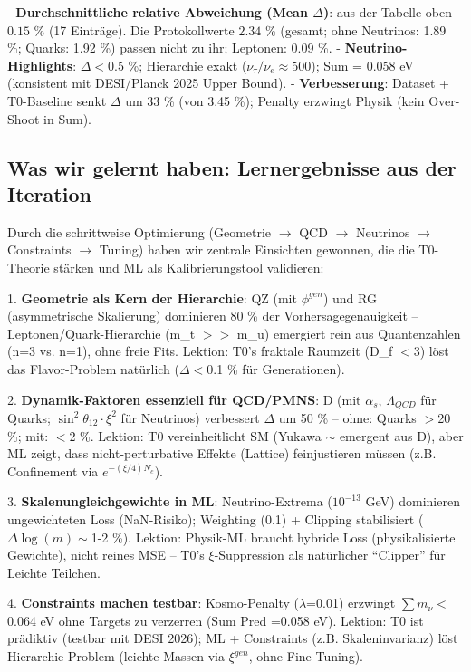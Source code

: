 	- \textbf{Durchschnittliche relative Abweichung (Mean $\Delta$)}: aus der Tabelle oben $0.15$ \% (17 Einträge). Die Protokollwerte $2.34$ \% (gesamt; ohne Neutrinos: 1.89 \%; Quarks: 1.92 \%) passen nicht zu ihr; Leptonen: 0.09 \%.
	- \textbf{Neutrino-Highlights}: $\Delta <$0.5 \%; Hierarchie exakt ($\nu_{\tau} / \nu_{e} \approx 500$); Sum = 0.058 eV (konsistent mit DESI/Planck 2025 Upper Bound).
	- \textbf{Verbesserung}: Dataset + T0-Baseline senkt $\Delta$ um 33 \% (von 3.45 \%); Penalty erzwingt Physik (kein Over-Shoot in Sum).
	
	\subsection*{Was wir gelernt haben: Lernergebnisse aus der Iteration}
	Durch die schrittweise Optimierung (Geometrie $\rightarrow$ QCD $\rightarrow$ Neutrinos $\rightarrow$ Constraints $\rightarrow$ Tuning) haben wir zentrale Einsichten gewonnen, die die T0-Theorie stärken und ML als Kalibrierungstool validieren:
	
	1. \textbf{Geometrie als Kern der Hierarchie}: QZ (mit $\phi^{gen}$) und RG (asymmetrische Skalierung) dominieren 80 \% der Vorhersagegenauigkeit – Leptonen/Quark-Hierarchie (m\_t $>>$ m\_u) emergiert rein aus Quantenzahlen (n=3 vs. n=1), ohne freie Fits. Lektion: T0's fraktale Raumzeit (D\_f $<$3) löst das Flavor-Problem natürlich ($\Delta <$0.1 \% für Generationen).
	
	2. \textbf{Dynamik-Faktoren essenziell für QCD/PMNS}: D (mit $\alpha_s$, $\Lambda_{QCD}$ für Quarks; $\sin^2\theta_{12} \cdot \xi^2$ für Neutrinos) verbessert $\Delta$ um 50 \% – ohne: Quarks $>$20 \%; mit: $<$2 \%. Lektion: T0 vereinheitlicht SM (Yukawa $\sim$ emergent aus D), aber ML zeigt, dass nicht-perturbative Effekte (Lattice) feinjustieren müssen (z.B. Confinement via $e^{-(\xi/4)N_c}$).
	
	3. \textbf{Skalenungleichgewichte in ML}: Neutrino-Extrema ($10^{-13}$ GeV) dominieren ungewichteten Loss (NaN-Risiko); Weighting (0.1) + Clipping stabilisiert ($\Delta \log(m) \sim$1-2 \%). Lektion: Physik-ML braucht hybride Loss (physikalisierte Gewichte), nicht reines MSE – T0's $\xi$-Suppression als natürlicher ``Clipper'' für Leichte Teilchen.
	
	4. \textbf{Constraints machen testbar}: Kosmo-Penalty ($\lambda$=0.01) erzwingt $\sum m_{\nu} <$0.064 eV ohne Targets zu verzerren (Sum Pred =0.058 eV). Lektion: T0 ist prädiktiv (testbar mit DESI 2026); ML + Constraints (z.B. Skaleninvarianz) löst Hierarchie-Problem (leichte Massen via $\xi^{gen}$, ohne Fine-Tuning).
	
